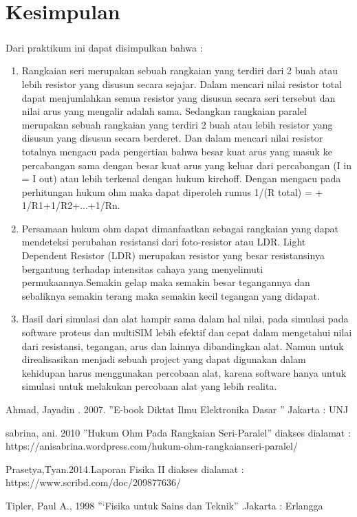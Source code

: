 \documentclass[12pt,a4paper]{article}
\begin{document}
\newpage
\section{Kesimpulan}
\subparagraph{ }
Dari praktikum ini dapat disimpulkan bahwa :
\begin{enumerate}

\item Rangkaian seri merupakan sebuah rangkaian yang terdiri dari 2 buah
atau lebih resistor yang disusun secara sejajar. Dalam mencari nilai
resistor total dapat menjumlahkan semua resistor yang disusun secara
seri tersebut dan nilai arus yang mengalir adalah sama. Sedangkan
rangkaian paralel merupakan sebuah rangkaian yang terdiri 2 buah atau
lebih resistor yang disusun yang disusun secara berderet. Dan dalam
mencari nilai resistor totalnya mengacu pada pengertian bahwa besar
kuat arus yang masuk ke percabangan sama dengan besar kuat arus
yang keluar dari percabangan (I in = I out) atau lebih terkenal dengan
hukum kirchoff. Dengan mengacu pada perhitungan hukum ohm maka
dapat diperoleh rumus 1/(R total) = + 1/R1+1/R2+...+1/Rn.

\item Persamaan hukum ohm dapat dimanfaatkan sebagai rangkaian yang
dapat mendeteksi perubahan resistansi dari foto-resistor atau LDR.
Light Dependent Resistor (LDR) merupakan resistor yang besar resistansinya bergantung terhadap intensitas cahaya yang menyelimuti
permukaannya.Semakin gelap maka semakin besar tegangannya dan
sebaliknya semakin terang maka semakin kecil tegangan yang didapat.

\item Hasil dari simulasi dan alat hampir sama dalam hal nilai, pada simulasi pada software proteus dan multiSIM lebih efektif dan cepat dalam
mengetahui nilai dari resistansi, tegangan, arus dan lainnya dibandingkan alat. Namun untuk direalisasikan menjadi sebuah project yang
dapat digunakan dalam kehidupan harus menggunakan percobaan alat,
karena software hanya untuk simulasi untuk melakukan percobaan alat
yang lebih realita.


\end{enumerate}

\newpage
\begin{thebibliography}{99} %
 {Ahmad, Jayadin . 2007. ”E-book Diktat Ilmu Elektronika Dasar ” Jakarta : UNJ }

 { sabrina, ani. 2010 ”Hukum Ohm Pada Rangkaian Seri-Paralel” diakses dialamat : https://anisabrina.wordpress.com/hukum-ohm-rangkaianseri-paralel/}

 {Prasetya,Tyan.2014.Laporan Fisika II diakses dialamat : https://www.scribd.com/doc/209877636/}

 {Tipler, Paul A., 1998 ”‘Fisika untuk Sains dan Teknik” .Jakarta : Erlangga }

\end{thebibliography}
\end{document}
